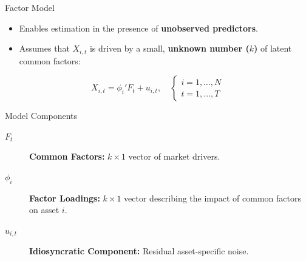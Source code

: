 \documentclass{beamer}
\begin{document}
\begin{frame}{Factor Model}
    \begin{itemize}
        \item Enables estimation in the presence of \textbf{unobserved predictors}.
        \item Assumes that $X_{i,t}$ is driven by a small, \textbf{unknown number ($k$)} of latent common factors:
    \end{itemize}

    \begin{center}
    \vspace{-0.3cm}
    \begin{equation*}
        X_{i,t} = \phi_i' F_t + u_{i,t}, \quad 
        \begin{cases} 
            i=1,\dots,N \\ 
            t=1,\dots,T 
        \end{cases}
    \end{equation*}
    \end{center}

    \begin{block}{Model Components}
        \begin{description}
            \item[$F_t$] \textbf{Common Factors:}  $k \times 1$ vector of market drivers.
            \item[$\phi_i$] \textbf{Factor Loadings:} $k \times 1$ vector describing the impact of common factors on asset $i$. 
            \item[$u_{i,t}$] \textbf{Idiosyncratic Component:} Residual asset-specific noise.
        \end{description}
    \end{block}
\end{frame}
\end{document}
